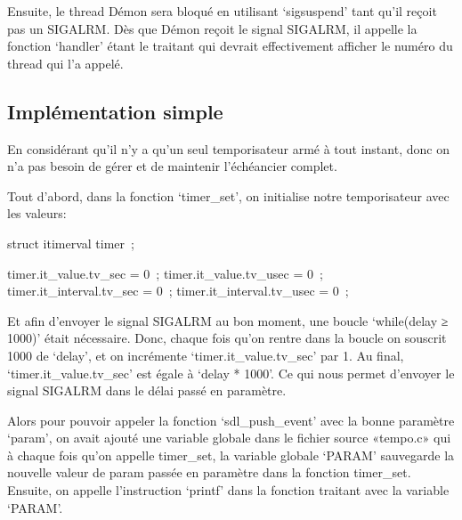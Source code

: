 \documentclass{article}
\begin{document}
Ensuite, le thread Démon sera bloqué en utilisant ‘sigsuspend’ tant qu’il reçoit pas un SIGALRM.
Dès que Démon reçoit le signal SIGALRM, il appelle la fonction ‘handler’ étant le traitant qui devrait effectivement afficher le numéro du thread qui l’a appelé.

\subsection{Implémentation simple}

En considérant qu’il n’y a qu’un seul temporisateur armé à tout instant, donc on n’a pas besoin de gérer et de maintenir l’échéancier complet. 

Tout d’abord, dans la fonction ‘timer_set’, on initialise notre temporisateur avec les valeurs:

struct itimerval timer ;

timer.it_value.tv_sec = 0 ;
timer.it_value.tv_usec = 0 ;
timer.it_interval.tv_sec = 0 ;
timer.it_interval.tv_usec = 0 ;

Et afin d’envoyer le signal SIGALRM au bon moment, une boucle ‘while(delay ≥ 1000)’ était nécessaire. Donc, chaque fois qu’on rentre dans la boucle on souscrit 1000 de ‘delay’, et on incrémente  ‘timer.it_value.tv_sec’ par 1. Au final, ‘timer.it_value.tv_sec’ est égale à ‘delay * 1000’.
Ce qui nous permet d’envoyer le signal SIGALRM dans le délai passé en paramètre.

Alors pour pouvoir appeler la fonction ‘sdl_push_event’ avec la bonne paramètre ‘param’, on avait ajouté une variable globale dans le fichier source «tempo.c» qui à chaque fois qu’on appelle timer_set, la variable globale ‘PARAM’ sauvegarde la nouvelle valeur de param passée en paramètre dans la fonction timer_set. 
Ensuite, on appelle l’instruction ‘printf’ dans la fonction traitant avec la variable ‘PARAM’.
\end{document}
